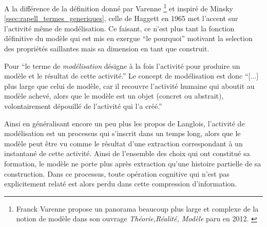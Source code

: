 A la différence de la définition donné par Varenne \footnote{Franck Varenne propose un panorama beaucoup plus large et complexe de la notion de modèle dans son ouvrage \textit{Théorie,Réalité, Modèle} paru en 2012. \autocite{Varenne2012}} et inspiré de Minsky \ref{ssec:rapell_termes_generiques}, celle de Haggett en 1965 met l'accent sur l'activité même de modélisation. Ce faisant, ce n'est plus tant la fonction définitive du modèle qui est mis en exergue { \enquote{le pourquoi} motivant la selection des propriétés saillantes} mais sa dimension en tant que construit.


Pour \textcite[36]{Langlois2005} \enquote{le terme de \textit{modélisation} désigne à la fois l'activité pour produire un modèle et le résultat de cette activité.} Le concept de modélisation est donc \enquote{[...] plus large que celui de modèle, car il recouvre l'activité humaine qui aboutit au modèle achevé, alors que le modèle est un objet (concret ou abstrait), volontairement dépouillé de l'activité qui l'a créé.} 

Ainsi en généralisant encore un peu plus les propos de Langlois, l'activité de modélisation est un processus qui s'inscrit dans un temps long, alors que le modèle peut être vu comme le résultat d'une extraction correspondant à un instantané de cette activité. Ainsi de l'ensemble des choix qui ont constitué sa formation, le modèle ne porte plus après extraction qu'une histoire partielle de sa construction. Dans ce processus, toute opération cognitive qui n'est pas explicitement relaté est alors perdu dans cette compression d'information.

